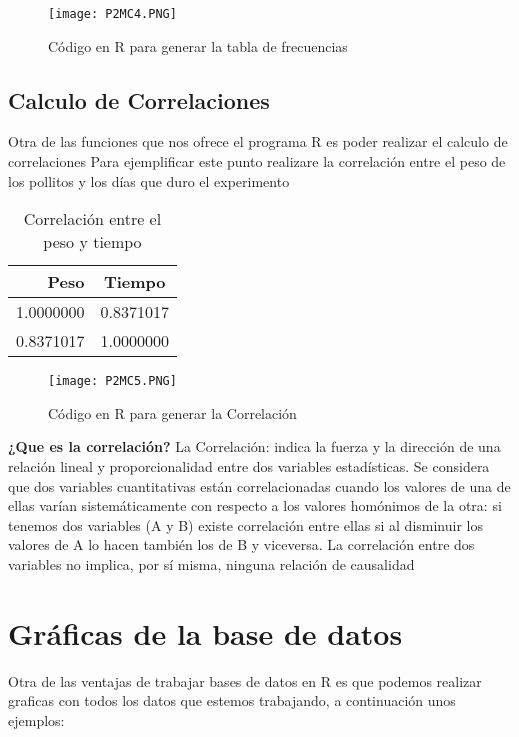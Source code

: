 \documentclass{article}
\begin{document}
\begin{figure}[h]
    \centering
    \texttt{[image: P2MC4.PNG]}
    \caption{Código en R para generar la tabla de frecuencias }
    \label{fig:mesh4}
\end{figure}

\subsection{Calculo de Correlaciones}
Otra de las funciones que nos ofrece el programa R es poder realizar el calculo de correlaciones
Para ejemplificar este punto realizare la correlación entre el peso de los pollitos y los días que duro el experimento

\begin{table}[h]
\begin{center}
\begin{tabular}{| r  | c |}
Peso & Tiempo  \\ \hline
1.0000000 & 0.8371017 \\
0.8371017 & 1.0000000 \\ \hline
\end{tabular}
\caption{Correlación entre el peso y tiempo}
\label{tab:correlacion}
\end{center}
\end{table}

\newpage
\begin{figure}[h]
    \centering
    \texttt{[image: P2MC5.PNG]}
    \caption{Código en R para generar la Correlación }
    \label{fig:mesh5}
\end{figure}

\textbf{¿Que es la correlación?}
\newline
La Correlación: indica la fuerza y la dirección de una relación lineal y proporcionalidad entre dos variables estadísticas. Se considera que dos variables cuantitativas están correlacionadas cuando los valores de una de ellas varían sistemáticamente con respecto a los valores homónimos de la otra: si tenemos dos variables (A y B) existe correlación entre ellas si al disminuir los valores de A lo hacen también los de B y viceversa. La correlación entre dos variables no implica, por sí misma, ninguna relación de causalidad 

\section{Gráficas de la base de datos}
Otra de las ventajas de trabajar bases de datos en R es que podemos realizar graficas con todos los datos que estemos trabajando, a continuación unos ejemplos:
\end{document}
